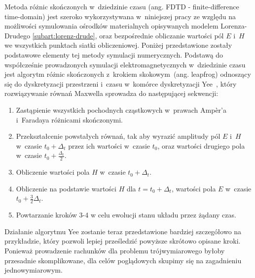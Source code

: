\label{subart:fdtd}
Metoda różnic skończonych w~dziedzinie czasu (ang. FDTD - finite-difference time-domain) jest szeroko wykorzystywana w~niniejszej pracy ze względu na możliwości symulowania ośrodków materialnych opisywanych modelem Lorenza-Drudego \ref{subart:lorenz-drude}, oraz bezpośrednie obliczanie wartości pól $E$ i~$H$ we wszystkich punktach siatki obliczeniowej. Poniżej przedstawione zostały podstawowe elementy tej metody symulacji numerycznych. Podstawą do współcześnie prowadzonych symulacji elektromagnetycznych w~dziedzinie czasu jest algorytm różnic skończonych z~krokiem skokowym~(ang. leapfrog)  odnoszący się do dyskretyzacji przestrzeni i~czasu w~komórce dyskretyzacji Yee~\cite{1966ITAP14302Y}, który rozwiązywanie równań Maxwella sprowadza do następującej sekwencji:
\begin{enumerate}
\item Zastąpienie wszystkich pochodnych cząstkowych w~prawach Amp\`{e}r'a i~Faradaya różnicami skończonymi.
\item Przekształcenie powstałych równań, tak aby wyrazić amplitudy pól $E$ i~$H$ w~czasie $t_0 +  \Delta_t$ przez ich wartości w~czasie $t_0$, oraz wartości drugiego pola w~czasie $t_0+ \frac{\Delta_t}{2}$.
\item Obliczenie wartości pola $H$ w~czasie $t_0 +  \Delta_t$.
\item Obliczenie na podstawie wartości $H$ dla $t=t_0+  \Delta_t$, wartości pola $E$ w~czasie $t_0 + \frac{3}{2} \Delta_t$.
\item Powtarzanie kroków 3-4 w celu ewolucji stanu układu przez żądany czas.
\end{enumerate}
Działanie algorytmu Yee zostanie teraz przedstawione bardziej szczegółowo na przykładzie, który pozwoli lepiej prześledzić powyższe skrótowo opisane kroki. Ponieważ prowadzenie rachunków dla problemu trójwymiarowego byłoby przesadnie skomplikowane, dla celów poglądowych skupimy się na zagadnieniu jednowymiarowym.

